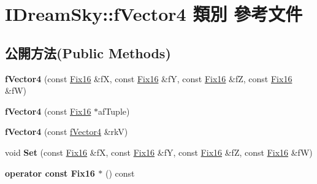 \hypertarget{class_i_dream_sky_1_1f_vector4}{}\section{I\+Dream\+Sky\+:\+:f\+Vector4 類別 參考文件}
\label{class_i_dream_sky_1_1f_vector4}
\subsection*{公開方法(Public Methods)}
\begin{DoxyCompactItemize}
\item 
{\bfseries f\+Vector4} (const \hyperlink{class_i_dream_sky_1_1_fix_point}{Fix16} \&fX, const \hyperlink{class_i_dream_sky_1_1_fix_point}{Fix16} \&fY, const \hyperlink{class_i_dream_sky_1_1_fix_point}{Fix16} \&fZ, const \hyperlink{class_i_dream_sky_1_1_fix_point}{Fix16} \&fW)\hypertarget{class_i_dream_sky_1_1f_vector4_a8b228315fe5beb7538f8298c092ea576}{}\label{class_i_dream_sky_1_1f_vector4_a8b228315fe5beb7538f8298c092ea576}

\item 
{\bfseries f\+Vector4} (const \hyperlink{class_i_dream_sky_1_1_fix_point}{Fix16} $\ast$af\+Tuple)\hypertarget{class_i_dream_sky_1_1f_vector4_a596d3fc65c40a499303ee6dd298c3297}{}\label{class_i_dream_sky_1_1f_vector4_a596d3fc65c40a499303ee6dd298c3297}

\item 
{\bfseries f\+Vector4} (const \hyperlink{class_i_dream_sky_1_1f_vector4}{f\+Vector4} \&rkV)\hypertarget{class_i_dream_sky_1_1f_vector4_aafa308598263a337f0f165c49a062943}{}\label{class_i_dream_sky_1_1f_vector4_aafa308598263a337f0f165c49a062943}

\item 
void {\bfseries Set} (const \hyperlink{class_i_dream_sky_1_1_fix_point}{Fix16} \&fX, const \hyperlink{class_i_dream_sky_1_1_fix_point}{Fix16} \&fY, const \hyperlink{class_i_dream_sky_1_1_fix_point}{Fix16} \&fZ, const \hyperlink{class_i_dream_sky_1_1_fix_point}{Fix16} \&fW)\hypertarget{class_i_dream_sky_1_1f_vector4_a095d31a994b790526cd69606f1858a61}{}\label{class_i_dream_sky_1_1f_vector4_a095d31a994b790526cd69606f1858a61}

\item 
{\bfseries operator const Fix16 $\ast$} () const \hypertarget{class_i_dream_sky_1_1f_vector4_ab9ab48fd7afd74f954e9f89b8da7e0ec}{}\label{class_i_dream_sky_1_1f_vector4_ab9ab48fd7afd74f954e9f89b8da7e0ec}


\end{DoxyCompactItemize}
